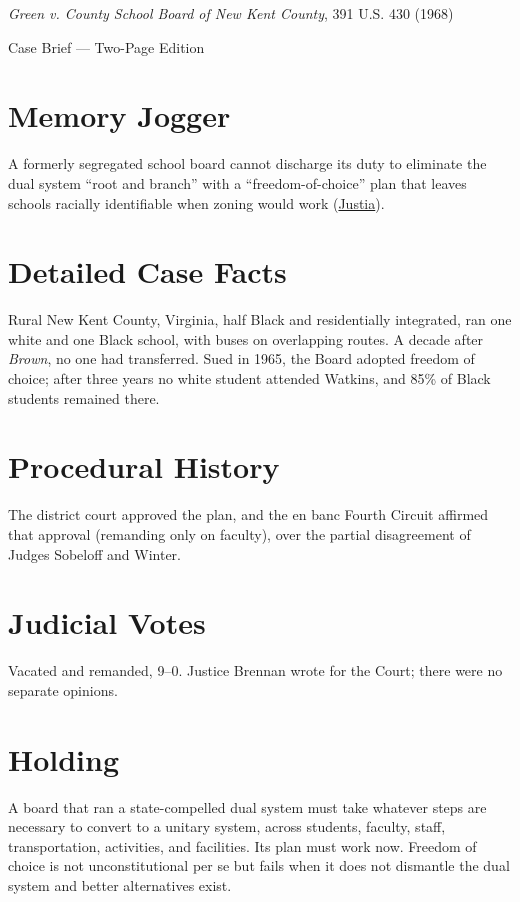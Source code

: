 \documentclass[12pt]{article}
\begin{document}
\begin{center}
{\LARGE \textit{Green v. County School Board of New Kent County}, 391 U.S. 430 (1968)\par}
\vspace{0.5em}
{\large Case Brief --- Two-Page Edition\par}
\end{center}

\section{Memory Jogger}
A formerly segregated school board cannot discharge its duty to eliminate the dual system ``root and branch'' with a ``freedom-of-choice'' plan that leaves schools racially identifiable when zoning would work (\href{https://supreme.justia.com/cases/federal/us/391/430/}{Justia}).

\section{Detailed Case Facts}
Rural New Kent County, Virginia, half Black and residentially integrated, ran one white and one Black school, with buses on overlapping routes. A decade after \textit{Brown}, no one had transferred. Sued in 1965, the Board adopted freedom of choice; after three years no white student attended Watkins, and 85\% of Black students remained there.

\section{Procedural History}
The district court approved the plan, and the en banc Fourth Circuit affirmed that approval (remanding only on faculty), over the partial disagreement of Judges Sobeloff and Winter.

\section{Judicial Votes}
Vacated and remanded, 9--0. Justice Brennan wrote for the Court; there were no separate opinions.

\section{Holding}
A board that ran a state-compelled dual system must take whatever steps are necessary to convert to a unitary system, across students, faculty, staff, transportation, activities, and facilities. Its plan must work now. Freedom of choice is not unconstitutional per se but fails when it does not dismantle the dual system and better alternatives exist.
\end{document}

